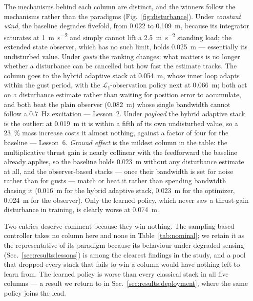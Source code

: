 The mechanisms behind each column are distinct, and the winners follow the mechanisms
rather than the paradigms (Fig.~\ref{fig:disturbance}). Under \emph{constant wind}, the baseline degrades fivefold,
from $0.022$ to \SI{0.109}{\meter}, because its integrator saturates at
\SI{1}{\meter\per\second\squared} and simply cannot lift a
\SI{2.5}{\meter\per\second\squared} standing load; the extended state observer, which
has no such limit, holds \SI{0.025}{\meter} --- essentially its undisturbed value. Under
\emph{gusts} the ranking changes: what matters is no longer whether a disturbance can be
cancelled but how fast the estimate tracks. The column goes to the hybrid adaptive stack
at \SI{0.054}{\meter}, whose inner loop adapts within the gust period, with the
$\mathcal{L}_1$-observation policy next at \SI{0.066}{\meter}; both act on a disturbance
estimate rather than waiting for position error to accumulate, and both beat the plain
observer (\SI{0.082}{\meter}) whose single bandwidth cannot follow a
\SI{0.7}{\hertz} excitation --- Lesson~2. Under \emph{payload} the hybrid
adaptive stack is the outlier: at \SI{0.019}{\meter} it is within a fifth of its own
undisturbed value, so a \SI{23}{\percent} mass increase costs it almost nothing, against
a factor of four for the baseline --- Lesson~6. \emph{Ground effect} is the mildest
column in the table: the multiplicative thrust gain is nearly collinear with the
feedforward the baseline already applies, so the baseline holds \SI{0.023}{\meter}
without any disturbance estimate at all, and the observer-based stacks --- once their
bandwidth is set for noise rather than for gusts --- match or beat it rather than
spending bandwidth chasing it (\SI{0.016}{\meter} for the hybrid adaptive stack,
\SI{0.023}{\meter} for the optimizer, \SI{0.024}{\meter} for the observer). Only the
learned policy, which never saw a thrust-gain disturbance in training, is clearly worse
at \SI{0.074}{\meter}.

Two entries deserve comment because they win nothing. The sampling-based controller
takes no column here and none in Table~\ref{tab:nominal}; we retain it as the
representative of its paradigm because its behaviour under degraded sensing
(Sec.~\ref{sec:results:lessons}) is among the clearest findings in the study, and a
pool that dropped every stack that fails to win a column would have nothing left to
learn from. The learned policy is worse than every classical stack in all five columns
--- a result we return to in Sec.~\ref{sec:results:deployment}, where the same policy
joins the lead.

